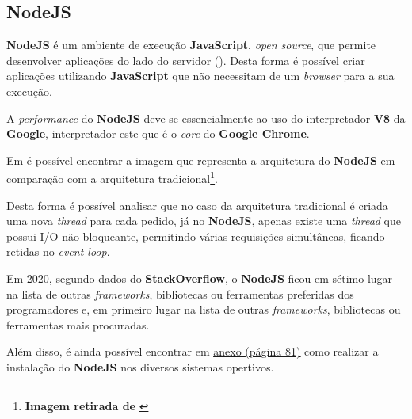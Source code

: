 \subsection{NodeJS}

\begin{minipage}{.3\textwidth}
\end{minipage}
\begin{minipage}{.7\textwidth}
	\minipagerestore
	\textbf{NodeJS} é um ambiente de execução \textbf{JavaScript}, \textit{open source}, que permite desenvolver aplicações do lado do servidor (). Desta forma é possível criar aplicações utilizando \textbf{JavaScript} que não necessitam de um \textit{browser} para a sua execução.

	A \textit{performance} do \textbf{NodeJS} deve-se essencialmente ao uso do interpretador \href{https://v8.dev}{\textbf{V8} da \textbf{Google}}, interpretador este que é o \textit{core} do \textbf{Google Chrome}.

\end{minipage}

Em  é possível encontrar a imagem que representa a arquitetura do \textbf{NodeJS} em comparação com a arquitetura tradicional\footnote{\textbf{Imagem retirada de} \cite{caseByCaseNode}}.

Desta forma é possível analisar que no caso da arquitetura tradicional é criada uma nova \textit{thread} para cada pedido, já no \textbf{NodeJS}, apenas existe uma \textit{thread} que possui I/O não bloqueante, permitindo várias requisições simultâneas, ficando retidas no \textit{event-loop}.

Em 2020, segundo dados do \href{https://insights.stackoverflow.com/survey/2020#technology-most-loved-dreaded-and-wanted-other-frameworks-libraries-and-tools-loved3}{\textbf{StackOverflow}}, o \textbf{NodeJS} ficou em sétimo lugar na lista de outras \textit{frameworks}, bibliotecas ou ferramentas preferidas dos programadores e, em primeiro lugar na lista de outras \textit{frameworks}, bibliotecas ou ferramentas mais procuradas.

Além disso, é ainda possível encontrar em \underline{\hyperref[nodeAttachments]{anexo {\footnotesize(página 81)}}} como realizar a instalação do \textbf{NodeJS} nos diversos sistemas opertivos.